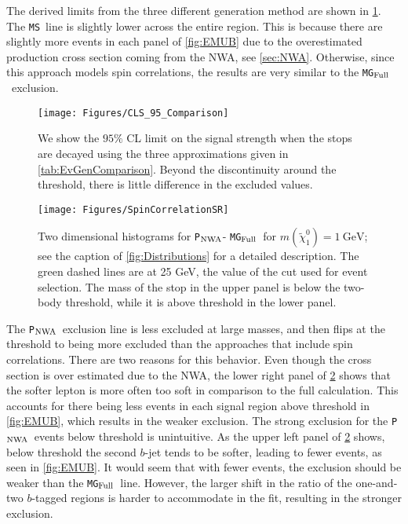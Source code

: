 \documentclass[a4paper,12pt]{article}
\newcommand{\gev}{~\text{GeV}}
\newcommand{\pythia}{\texttt{P}$_{\rm{NWA}}$}
\newcommand{\mg}{\texttt{MG}$_{\rm{Full}}$}
\newcommand{\ms}{\texttt{MS}}
\begin{document}
The derived limits from the three different generation method are shown in \cref{fig:Compare}. The \ms\ line is slightly lower across the entire region. This is because there are slightly more events in each panel of \cref{fig:EMUB} due to the overestimated production cross section coming from the NWA, see \cref{sec:NWA}. Otherwise, since this approach models spin correlations, the results are very similar to the \mg\ exclusion. 

\begin{figure}[t!]
\begin{center}
\texttt{[image: Figures/CLS\_95\_Comparison]}
\caption{We show the $95\%$ CL limit on the signal strength when the stops are decayed using the three approximations given in \cref{tab:EvGenComparison}.  Beyond the discontinuity around the threshold, there is little difference in the excluded values.}
\label{fig:Compare}
\end{center}
\end{figure}


\begin{figure}[t]
\begin{center}
\texttt{[image: Figures/SpinCorrelationSR]}
\caption{Two dimensional histograms for \pythia - \mg \, for $m(\tilde{\chi}^0_1)=1\gev$; see the caption of \cref{fig:Distributions} for a detailed description.  The green dashed lines are at 25 GeV, the value of the cut used for event selection.  The mass of the stop in the upper panel is below the two-body threshold, while it is above threshold in the lower panel.}
\label{fig:SCSR}
\end{center}
\end{figure}

The \pythia\ exclusion line is less excluded at large masses, and then flips at the threshold to being more excluded than the approaches that include spin correlations. There are two reasons for this behavior.  Even though the cross section is over estimated due to the NWA, the lower right panel of \cref{fig:SCSR} shows that the softer lepton is more often too soft in comparison to the full calculation. This accounts for there being less events in each signal region above threshold in \cref{fig:EMUB}, which results in the weaker exclusion. The strong exclusion for the \pythia\ events below threshold is unintuitive.  As the upper left panel of \cref{fig:SCSR} shows, below threshold the second $b$-jet tends to be softer, leading to fewer events, as seen in \cref{fig:EMUB}.  It would seem that with fewer events, the exclusion should be weaker than the \mg\ line. However, the larger shift in the ratio of the one-and-two $b$-tagged regions is harder to accommodate in the fit, resulting in the stronger exclusion.
\end{document}
